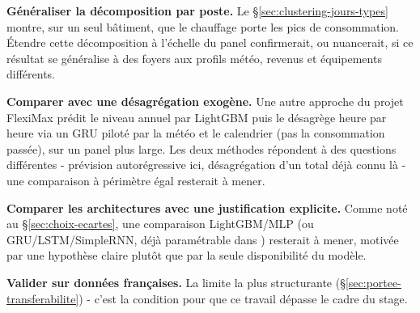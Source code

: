 \textbf{Généraliser la décomposition par poste.} Le \S\ref{sec:clustering-jours-types} montre, sur
un seul bâtiment, que le chauffage porte les pics de consommation. Étendre cette décomposition à
l'échelle du panel confirmerait, ou nuancerait, si ce résultat se généralise à des foyers aux
profils météo, revenus et équipements différents.

\textbf{Comparer avec une désagrégation exogène.} Une autre approche du projet FlexiMax prédit le
niveau annuel par LightGBM puis le désagrège heure par heure via un GRU piloté par la météo et le
calendrier (pas la consommation passée), sur un panel plus large. Les deux méthodes répondent à des
questions différentes - prévision autorégressive ici, désagrégation d'un total déjà connu là - une
comparaison à périmètre égal resterait à mener.

\textbf{Comparer les architectures avec une justification explicite.} Comme noté au
\S\ref{sec:choix-ecartes}, une comparaison LightGBM/MLP (ou GRU/LSTM/SimpleRNN, déjà paramétrable
dans ) resterait à mener, motivée par une hypothèse claire plutôt que
par la seule disponibilité du modèle.

\textbf{Valider sur données françaises.} La limite la plus structurante
(\S\ref{sec:portee-transferabilite}) - c'est la condition pour que ce travail dépasse le cadre du
stage.

